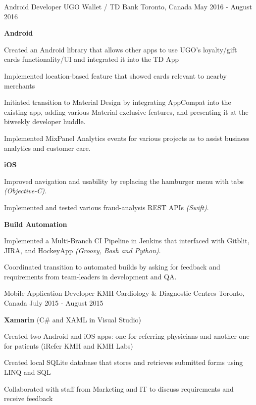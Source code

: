 \begin{cventries}
  \cventry
    {Android Developer}
    {UGO Wallet / TD Bank}
    {Toronto, Canada}
    {May 2016 - August 2016}
    {
      \begin{cvitems}
        \item[]{\textbf {Android}}
        \item{Created an Android library that allows other apps to use UGO’s loyalty/gift cards functionality/UI and integrated it into the TD App}
        \item{Implemented location-based feature that showed cards relevant to nearby merchants}
        \item{Initiated transition to Material Design by integrating AppCompat into the existing app, adding various Material-exclusive features, and presenting it at the biweekly developer huddle.}
        \item{Implemented MixPanel Analytics events for various projects as to assist business analytics and customer care.}
        \item[]{\textbf {iOS}}
        \item{Improved navigation and usability by replacing the hamburger menu with tabs \textit{(Objective-C)}.}
        \item{Implemented and tested various fraud-analysis REST APIs \textit{(Swift)}.}
        \item[]{\textbf {Build Automation}}
        \item{Implemented a Multi-Branch CI Pipeline in Jenkins that interfaced with Gitblit, JIRA, and HockeyApp \textit{(Groovy, Bash and Python)}.}
        \item{Coordinated transition to automated builds by asking for feedback and requirements from team-leaders in development and QA.}
      \end{cvitems}
    }
  \cventry
    {Mobile Application Developer}
    {KMH Cardiology \& Diagnostic Centres}
    {Toronto, Canada}
    {July 2015 - August 2015}
    {
      \begin{cvitems}
        \item[]{\textbf {Xamarin} (C\# and XAML in Visual Studio)}
        \item{Created two Android and iOS apps: one for referring physicians and another one for patients (iRefer KMH and KMH Labs)}
        \item{Created local SQLite database that stores and	retrieves submitted	forms using LINQ and SQL}
        \item{Collaborated with staff from Marketing and IT to discuss requirements and receive feedback}
      \end{cvitems}
    }
\end{cventries}
